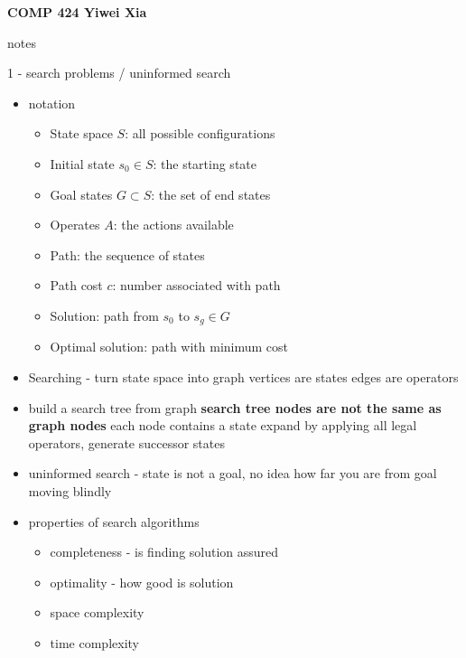 \documentclass[11pt]{article}
\newcommand{\ee}[1]{\ensuremath{#1}}
\begin{document}

\thispagestyle{empty}

\noindent \textbf{COMP 424 \hfill Yiwei Xia}
\begin{center}
{\LARGE notes}
\end{center}

\begin{description}

\item 1 - search problems / uninformed search
\begin{itemize}
	\item notation
	\begin{itemize}
		\item State space \ee{S}: all possible configurations
		\item Initial state \ee{s_0 \in S}: the starting state
		\item Goal states \ee{G \subset S}: the set of end states
		\item Operates \ee{A}: the actions available
		\item Path: the sequence of states
		\item Path cost \ee{c}: number associated with path
		\item Solution: path from \ee{s_0} to \ee{s_g \in G}
		\item Optimal solution: path with minimum cost 
	\end{itemize}
	\item Searching - turn state space into graph
	\subitem vertices are states
	\subitem edges are operators
	\item build a search tree from graph
	\subitem \textbf{search tree nodes are not the same as graph nodes}
	\subitem each node contains a state
	\subitem expand by applying all legal operators, generate successor states
	\item uninformed search - state is not a goal, no idea how far you are from goal
	\subitem moving blindly
		\item properties of search algorithms
	\begin{itemize}
		\item completeness - is finding solution assured
		\item optimality - how good is solution
		\item space complexity
		\item time complexity

\end{itemize}
\end{itemize}
\end{description}
\end{document}
